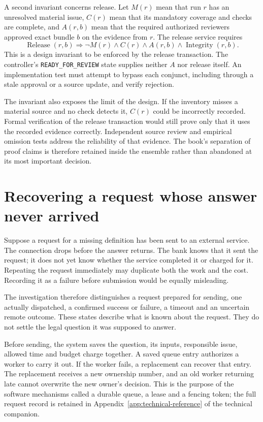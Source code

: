 \documentclass[12pt,a4paper,oneside,openany]{book}
\begin{document}
A second invariant concerns release. Let $M(r)$ mean that run $r$ has an unresolved
material issue, $C(r)$ mean that its mandatory coverage and checks are complete,
and $A(r,b)$ mean that the required authorized reviewers approved exact bundle
$b$ on the evidence from $r$. The release service requires
\begin{equation}
 \operatorname{Release}(r,b)\Longrightarrow
 \neg M(r)\land C(r)\land A(r,b)\land\operatorname{Integrity}(r,b).
 \label{eq:ensemble-release}
\end{equation}
This is a design invariant to be enforced by the release transaction. The
controller's \texttt{READY\_FOR\_REVIEW} state supplies neither $A$ nor release
itself. An implementation test must attempt to bypass each conjunct, including
through a stale approval or a source update, and verify rejection.

The invariant also exposes the limit of the design. If the inventory misses a
material source and no check detects it, $C(r)$ could be incorrectly recorded.
Formal verification of the release transaction would still prove only that it
uses the recorded evidence correctly. Independent source review and empirical
omission tests address the reliability of that evidence. The book's separation
of proof claims is therefore retained inside the ensemble rather than abandoned
at its most important decision.

\section{Recovering a request whose answer never arrived}
\label{merge:M06:17}


Suppose a request for a missing definition has been sent to an external service.
The connection drops before the answer returns. The bank knows that it sent the
request; it does not yet know whether the service completed it or charged for it.
Repeating the request immediately may duplicate both the work and the cost.
Recording it as a failure before submission would be equally misleading.

The investigation therefore distinguishes a request prepared for sending, one
actually dispatched, a confirmed success or failure, a timeout and an uncertain
remote outcome. These states describe what is known about the request. They do
not settle the legal question it was supposed to answer.

Before sending, the system saves the question, its inputs, responsible issue,
allowed time and budget charge together. A saved queue entry authorizes a worker
to carry it out. If the worker fails, a replacement can recover that entry. The
replacement receives a new ownership number, and an old worker returning late
cannot overwrite the new owner's decision. This is the purpose of the software
mechanisms called a durable queue, a lease and a fencing token; the full request
record is retained in Appendix~\ref{app:technical-reference} of the technical companion.
\end{document}
